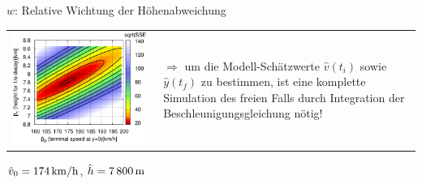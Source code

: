\begin{landscape}
\begin{center}
$w$: Relative Wichtung der H\"ohenabweichung 


\newpage

\vspace{-2em}

\begin{tabular}{ll}
\includegraphics[width=0.96\textwidth]{figsFreefall/freefall_objLandscape.eps}
&
\parbox{0.30\textwidth}{\vspace{-20em}

$\Rightarrow$ um die Modell-Sch\"atzwerte $\hat{v}(t_i)$ sowie
$\hat{y}(t_f)$ zu bestimmen, ist eine komplette Simulation des freien
Falls durch  Integration der Beschleunigungsgleichung n\"otig!
}
\end{tabular}


\newpage
\vspace{1ex}


$\hat{v}_0=\unit[174]{km/h}$, $\hat{h}=\unit[7\,800]{m}$

\newpage
\vspace{1ex}


\end{center}
\end{landscape}

